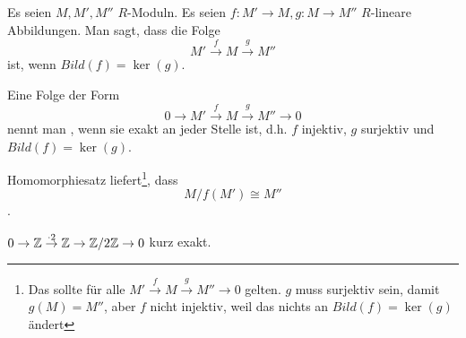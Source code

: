 \documentclass[../main.tex]{subfiles}
\begin{document}
\begin{definition}
    Es seien $M,M',M''$ $R$-Moduln.
    Es seien $f:M'\rightarrow M, g:M\rightarrow M''$ $R$-lineare Abbildungen.
    Man sagt, dass die Folge $$M'\overset{f}{\rightarrow} M \overset{g}{\rightarrow} M''$$
     ist, wenn $Bild(f) = \ker(g)$.

    Eine Folge der Form $$0\rightarrow M'\overset{f}{\rightarrow} M \overset{g}{\rightarrow} M'' \rightarrow 0$$ nennt man , wenn sie exakt an jeder Stelle ist, d.h. $f$ injektiv, $g$ surjektiv und $Bild(f) = \ker(g)$.

    Homomorphiesatz liefert\footnote{Das sollte für alle $M'\overset{f}{\rightarrow} M \overset{g}{\rightarrow} M'' \rightarrow 0$ gelten. $g$ muss surjektiv sein, damit $g(M) = M''$, aber $f$ nicht injektiv, weil das nichts an $Bild(f)=\ker(g)$ ändert}, dass
    $$M/f(M') \cong M''$$.
\end{definition}
\begin{example*}
    $0\rightarrow \mathbb{Z}\overset{\cdot 2}{\rightarrow} \mathbb{Z} \rightarrow \mathbb{Z}/2\mathbb{Z} \rightarrow 0$ kurz exakt.
\end{example*}
\end{document}
